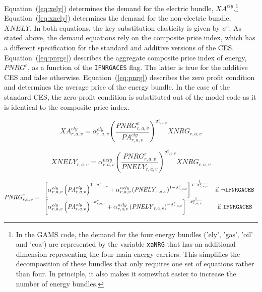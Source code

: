 \documentclass[11pt,letterpaper]{report}
\begin{document}
Equation~(\ref{eq:xely}) determines the demand for the electric bundle,
$\mathit{XA^{\mathit{ely}}}$.\footnote{In the GAMS code, the demand for the four
energy bundles ('ely', 'gas', 'oil' and 'coa') are represented by the variable
\texttt{xaNRG} that has an additional dimension representing the four main
energy carriers. This simplifies the decomposition of these bundles that only
requires one set of equations rather than four. In principle, it also makes it
somewhat easier to increase the number of energy bundles.}
Equation~(\ref{eq:xnely}) determines the demand for the non-electric bundle,
$\mathit{XNELY}$. In both equations, the key substitution elasticity is given by
$\sigma^{\mathit{e}}$. As stated above, the demand equations rely
on the composite price index, which has a different specification
for the standard and additive versions of the CES. Equation~(\ref{eq:pnrgc})
describes the aggregate composite price index of energy, $\mathit{PNRG}^c$, as
a function of the \texttt{IFNRGACES} flag. The latter is
true for the additive CES and false otherwise. Equation~(\ref{eq:pnrg})
describes the zero profit condition and determines the average price of the
energy bundle. In the case of the standard CES, the zero-profit condition
is substituted out of the model code as it is identical to the composite
price index.

\begin{equation}
\label{eq:xely}
\mathit{XA}^{\mathit{ely}}_{r,a,v} =
   \alpha^{\mathit{ely}}_{\mathit{r,a,v}}
   \left( \frac {\mathit{PNRG}^c_{r,a,v}} {\mathit{PA}^{\mathit{ely}}_{r,a,v}}
   \right)^{\sigma^{\mathit{e}}_{\mathit{r,a,v}}}
   \mathit{XNRG}_{r,a,v}
\end{equation}

\begin{equation}
\label{eq:xnely}
\mathit{XNELY}_{r,a,v} =
   \alpha^{\mathit{nely}}_{\mathit{r,a,v}}
   \left( \frac {\mathit{PNRG}^c_{r,a,v}} {\mathit{PNELY}_{r,a,v}}
   \right)^{\sigma^{\mathit{e}}_{\mathit{r,a,v}}}
   \mathit{XNRG}_{r,a,v}
\end{equation}

\begin{equation}
\label{eq:pnrgc}
\mathit{PNRG}^c_{r,a,v} =
\begin{array}{l c l}
   \left[
      \alpha^{\mathit{ely}}_{\mathit{r,a,v}}
      \left( \mathit{PA}^{\mathit{ely}}_{r,a,v}
      \right)^{1 - \sigma^{\mathit{e}}_{\mathit{r,a,v}}}
   +  \alpha^{\mathit{nely}}_{\mathit{r,a,v}}
      \left( \mathit{PNELY}_{r,a,v}
      \right)^{1 - \sigma^{\mathit{e}}_{\mathit{r,a,v}}}
   \right]^{\frac{1} {1 - \sigma^{\mathit{e}}_{\mathit{r,a,v}}}} &
	\textrm{if } \lnot \texttt{IFNRGACES} \\
   \left[
      \alpha^{\mathit{ely}}_{\mathit{r,a,v}}
      \left( \mathit{PA}^{\mathit{ely}}_{r,a,v}
      \right)^{-\sigma^{\mathit{e}}_{\mathit{r,a,v}}}
   +  \alpha^{\mathit{nely}}_{\mathit{r,a,v}}
      \left( \mathit{PNELY}_{r,a,v}
      \right)^{-\sigma^{\mathit{e}}_{\mathit{r,a,v}}}
   \right]^{-\frac{1} {\sigma^{\mathit{e}}_{\mathit{r,a,v}}}} &
	\textrm{if } \texttt{IFNRGACES} \\
\end{array}
\end{equation}
\end{document}
